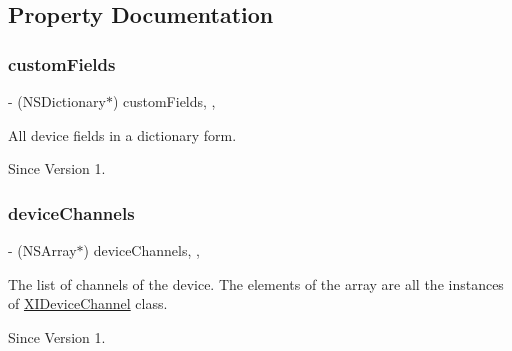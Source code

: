 \subsection{Property Documentation}
\hypertarget{class_x_i_device_info_a7f957997e697f1766cd29a57cda05f37}{}\label{class_x_i_device_info_a7f957997e697f1766cd29a57cda05f37} 
\subsubsection{\texorpdfstring{custom\+Fields}{customFields}}
{\footnotesize\ttfamily -\/ (N\+S\+Dictionary$\ast$) custom\+Fields\hspace{0.3cm}{\ttfamily [read]}, {\ttfamily [nonatomic]}, {\ttfamily [assign]}}



All device fields in a dictionary form. 

\begin{DoxySince}{Since}
Version 1. 
\end{DoxySince}
\hypertarget{class_x_i_device_info_a618f25a4cfac3972fb86c59ada06c662}{}\label{class_x_i_device_info_a618f25a4cfac3972fb86c59ada06c662} 
\subsubsection{\texorpdfstring{device\+Channels}{deviceChannels}}
{\footnotesize\ttfamily -\/ (N\+S\+Array$\ast$) device\+Channels\hspace{0.3cm}{\ttfamily [read]}, {\ttfamily [nonatomic]}, {\ttfamily [assign]}}



The list of channels of the device. The elements of the array are all the instances of \hyperlink{class_x_i_device_channel}{X\+I\+Device\+Channel} class. 

\begin{DoxySince}{Since}
Version 1. 
\end{DoxySince}
\hypertarget{class_x_i_device_info_aa89ded62978ed5dee588d15b388fd455}{}\label{class_x_i_device_info_aa89ded62978ed5dee588d15b388fd455} 
